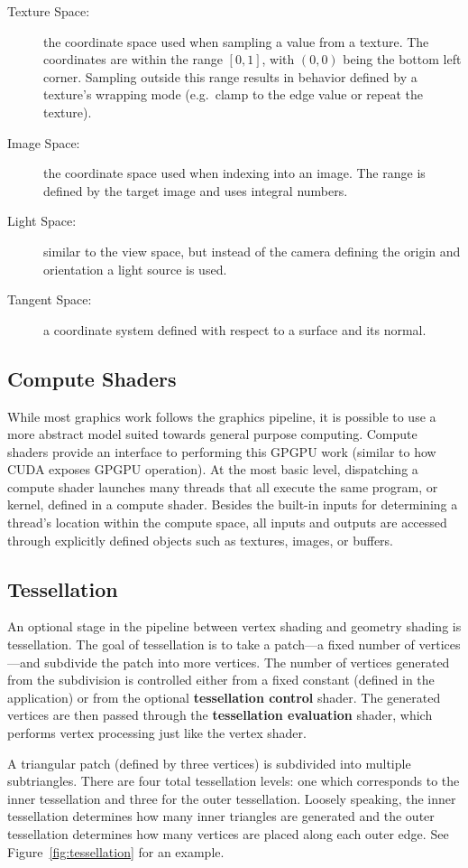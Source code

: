 \begin{description}
    \item[Texture Space:] the coordinate space used when sampling a value from a texture. The coordinates are within the range $[0, 1]$, with $(0, 0)$ being the bottom left corner. Sampling outside this range results in behavior defined by a texture's wrapping mode (e.g.\ clamp to the edge value or repeat the texture).
    \item[Image Space:] the coordinate space used when indexing into an image. The range is defined by the target image and uses integral numbers.
    \item[Light Space:] similar to the view space, but instead of the camera defining the origin and orientation a light source is used.
    \item[Tangent Space:] a coordinate system defined with respect to a surface and its normal.
\end{description}

\subsection{Compute Shaders}
While most graphics work follows the graphics pipeline, it is possible to use a more abstract model suited towards general purpose computing. Compute shaders provide an interface to performing this GPGPU work (similar to how CUDA exposes GPGPU operation). At the most basic level, dispatching a compute shader launches many threads that all execute the same program, or kernel, defined in a compute shader. Besides the built-in inputs for determining a thread's location within the compute space, all inputs and outputs are accessed through explicitly defined objects such as textures, images, or buffers.

\subsection{Tessellation}
An optional stage in the pipeline between vertex shading and geometry shading is tessellation. The goal of tessellation is to take a patch---a fixed number of vertices---and subdivide the patch into more vertices. The number of vertices generated from the subdivision is controlled either from a fixed constant (defined in the application) or from the optional \textbf{tessellation control} shader. The generated vertices are then passed through the \textbf{tessellation evaluation} shader, which performs vertex processing just like the vertex shader.

A triangular patch (defined by three vertices) is subdivided into multiple subtriangles. There are four total tessellation levels: one which corresponds to the inner tessellation and three for the outer tessellation. Loosely speaking, the inner tessellation determines how many inner triangles are generated and the outer tessellation determines how many vertices are placed along each outer edge. See Figure~\ref{fig:tessellation} for an example.

